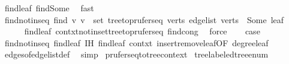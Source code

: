 \begin{isabellebody}
\ find{\isacharunderscore}{\kern0pt}leaf\ find{\isacharunderscore}{\kern0pt}Some\ \isamarkupfalse%
\ fast\isanewline
\ \ \isamarkupfalse%
\ find{\isacharunderscore}{\kern0pt}not{\isacharunderscore}{\kern0pt}in{\isacharunderscore}{\kern0pt}seq{\isacharcolon}{\kern0pt}\ {\isachardoublequoteopen}find\ {\isacharparenleft}{\kern0pt}{\isasymlambda}v{\isachardot}{\kern0pt}\ v\ {\isasymnotin}\ set\ {\isacharparenleft}{\kern0pt}tree{\isacharunderscore}{\kern0pt}to{\isacharunderscore}{\kern0pt}prufer{\isacharunderscore}{\kern0pt}seq\ verts\ {\isacharquery}{\kern0pt}edge{\isacharunderscore}{\kern0pt}list{\isacharparenright}{\kern0pt}{\isacharparenright}{\kern0pt}\ verts\ {\isacharequal}{\kern0pt}\ Some\ leaf{\isachardoublequoteclose}\isanewline
\ \ \ \ \isamarkupfalse%
\ find{\isacharunderscore}{\kern0pt}leaf\ contxt{\isachardot}{\kern0pt}notin{\isacharunderscore}{\kern0pt}set{\isacharunderscore}{\kern0pt}tree{\isacharunderscore}{\kern0pt}to{\isacharunderscore}{\kern0pt}prufer{\isacharunderscore}{\kern0pt}seq\ find{\isacharunderscore}{\kern0pt}cong\ \isamarkupfalse%
\ force\isanewline
\ \ \isamarkupfalse%
\ {\isacharquery}{\kern0pt}case\ \isamarkupfalse%
\ find{\isacharunderscore}{\kern0pt}not{\isacharunderscore}{\kern0pt}in{\isacharunderscore}{\kern0pt}seq\ find{\isacharunderscore}{\kern0pt}leaf\ {\isachardoublequoteopen}{}{\isachardot}{\kern0pt}IH{\isachardoublequoteclose}\ find{\isacharunderscore}{\kern0pt}leaf\ contxt{\isacharprime}{\kern0pt}\ insert{\isacharunderscore}{\kern0pt}remove{\isacharunderscore}{\kern0pt}leaf{\isacharbrackleft}{\kern0pt}OF\ degree{\isacharunderscore}{\kern0pt}leaf{\isacharbrackright}{\kern0pt}\isanewline
\ \ \ \ \isamarkupfalse%
\ edges{\isacharunderscore}{\kern0pt}of{\isacharunderscore}{\kern0pt}edge{\isacharunderscore}{\kern0pt}list{\isacharunderscore}{\kern0pt}def\ \isamarkupfalse%
\ simp\isanewline
{}\isamarkupfalse%
%
\endisatagproof
{\isafoldproof}%
%
\isadelimproof
\isanewline
%
\endisadelimproof
\isanewline
{}\isamarkupfalse%
\isanewline
\isanewline
{}\isamarkupfalse%
\ prufer{\isacharunderscore}{\kern0pt}seq{\isacharunderscore}{\kern0pt}to{\isacharunderscore}{\kern0pt}tree{\isacharunderscore}{\kern0pt}context\isanewline
{}\isanewline
\isanewline
{}\isamarkupfalse%
\ tree{\isacharunderscore}{\kern0pt}labeled{\isacharunderscore}{\kern0pt}tree{\isacharunderscore}{\kern0pt}enum{\isacharcolon}{\kern0pt}\isanewline

\end{isabellebody}

